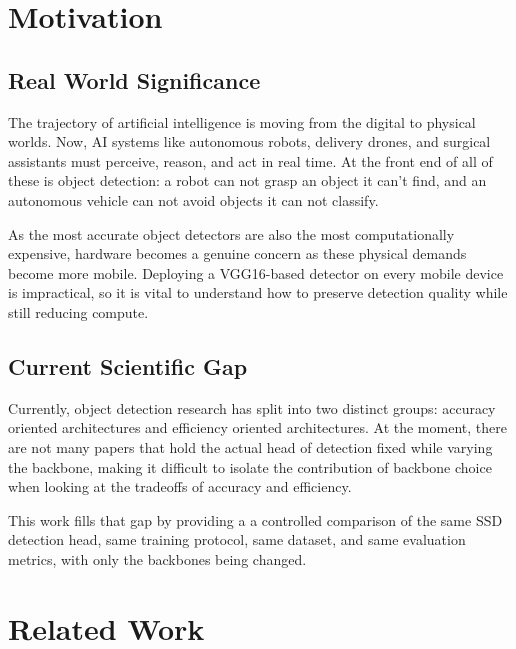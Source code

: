 \documentclass{article}
\begin{document}
\section{Motivation}
\label{sec:motivation}

\subsection{Real World Significance}

\qquad The trajectory of artificial intelligence is moving from the digital to physical worlds. Now, AI systems like autonomous robots, delivery drones, and surgical assistants must perceive, reason, and act in real time. At the front end of all of these is object detection: a robot can not grasp an object it can't find, and an autonomous vehicle can not avoid objects it can not classify.

\qquad As the most accurate object detectors are also the most computationally expensive, hardware becomes a genuine concern as these physical demands become more mobile. Deploying a VGG16-based detector on every mobile device is impractical, so it is vital to understand how to preserve detection quality while still reducing compute. 

\subsection{Current Scientific Gap}
\qquad Currently, object detection research has split into two distinct groups: accuracy oriented architectures and efficiency oriented architectures. At the moment, there are not many papers that hold the actual head of detection fixed while varying the backbone, making it difficult to isolate the contribution of backbone choice when looking at the tradeoffs of accuracy and efficiency. 

\qquad This work fills that gap by providing a a controlled comparison of the same SSD detection head, same training protocol, same dataset, and same evaluation metrics, with only the backbones being changed. 

\section{Related Work}
\label{sec:related}
\end{document}
